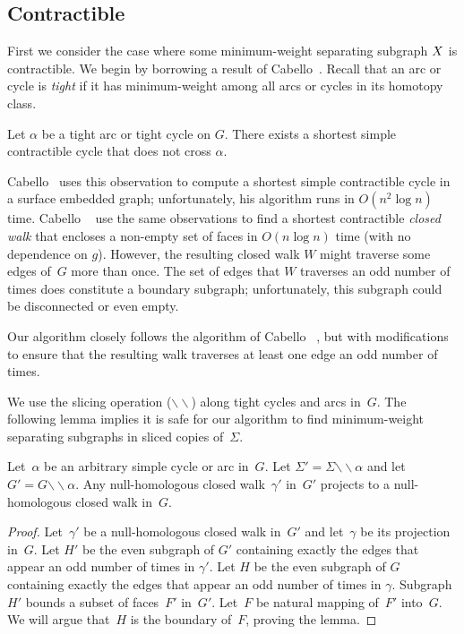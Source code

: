 \documentclass[letterpaper,review]{siamart190516}
\def\snip{\mathbin{\raisebox{0.15ex}{\rotatebox[origin=c]{60}{\Rightscissors}\!}}}
\def\snip{\mathbin{\backslash\!\!\backslash}}
\def\subsnip{\mathbin{\raisebox{0.15ex}{\rotatebox[origin=c]{60}{\footnotesize\Rightscissors}\!}}}
\def\Gsnip{\mathord{G_{\subsnip}}}
\def\Sigmasnip{\mathord{\Sigma_{\subsnip}}}
\def\gammasnip{\mathord{\gamma_{\subsnip}}}
\def\Gsnip{G'}
\def\Fsnip{F'}
\def\Sigmasnip{\Sigma'}
\def\gammasnip{\gamma'}
\def\Hsnip{H'}
\begin{document}
{%

\subsection{Contractible}
\label{sec:global_contractible}

First we consider the case where some minimum-weight separating subgraph $X$ is contractible.  
We begin by borrowing a result of Cabello~\cite[Lemma 4.1]{c-fscss-10}.  Recall that an arc or cycle is \emph{tight} if it has minimum-weight among all arcs or cycles in its homotopy class.

\begin{lemma}
\label{lem:disjoint-tight-arc}
Let $\alpha$ be a tight arc or tight cycle on $G$.  There exists a shortest simple contractible cycle that does not cross $\alpha$.
\end{lemma}

Cabello~\cite{c-fscss-10} uses this observation to compute a shortest simple contractible cycle in a surface embedded graph; unfortunately, his algorithm runs in $O(n^2\log n)$ time.
Cabello \etal~\cite{cdem-fotc-10} use the same observations to find a shortest contractible \emph{closed walk} that encloses a non-empty set of faces in $O(n\log n)$ time (with no dependence on $g$).
However, the resulting closed walk $W$ might traverse some edges of~$G$ more than once.  The set of edges that $W$ traverses an odd number of times does constitute a boundary subgraph; unfortunately, this subgraph could be disconnected or even empty.

Our algorithm closely follows the algorithm of Cabello \etal~\cite{cdem-fotc-10}, but with modifications to ensure that the resulting walk traverses at least one edge an odd number of times.

We use the slicing operation ($\snip$) along tight cycles and arcs in~$G$.  The following lemma
implies it is safe for our algorithm to find minimum-weight separating subgraphs in sliced copies
of~$\Sigma$.

\begin{lemma}
\label{lem:global_null-homologous-projections}
Let~$\alpha$ be an arbitrary simple cycle or arc in~$G$.
Let
${\Sigmasnip = \Sigma \snip \alpha}$ and let~$\Gsnip = G \snip \alpha$. Any null-homologous closed
walk~$\gammasnip$ in~$\Gsnip$ projects  to a null-homologous closed walk in~$G$.
\end{lemma}

\begin{proof}
Let~$\gammasnip$ be a null-homologous closed walk in~$\Gsnip$ and let~$\gamma$ be its projection in~$G$.
Let $\Hsnip$ be the even subgraph of $\Gsnip$ containing exactly the edges that appear an odd number of
times in $\gammasnip$.
Let $H$ be the even subgraph of $G$ containing exactly the edges that appear an odd number of times
in $\gamma$.
Subgraph~$\Hsnip$ bounds a subset of faces~$\Fsnip$ in~$\Gsnip$. 
Let~$F$ be natural mapping of~$\Fsnip$ into~$G$.
We will argue that~$H$ is the boundary of~$F$, proving the lemma.


\end{proof}}
\end{document}
